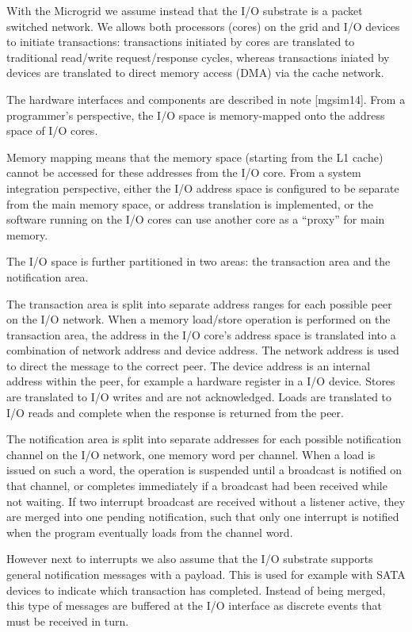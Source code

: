 With the Microgrid we assume instead that the I/O substrate is a
packet switched network. We allows both processors (cores) on the grid
and I/O devices to initiate transactions: transactions initiated by
cores are translated to traditional read/write request/response
cycles, whereas transactions iniated by devices are translated to
direct memory access (DMA) via the cache network.


The hardware interfaces and components are described in note
[mgsim14]. From a programmer's perspective, the I/O space is
memory-mapped onto the address space of I/O cores. 

Memory mapping means that the memory space (starting from the L1
cache) cannot be accessed for these addresses from the I/O core. From
a system integration perspective, either the I/O address space is
configured to be separate from the main memory space, or address
translation is implemented, or the software running on the I/O cores
can use another core as a ``proxy'' for main memory.

The I/O space is further partitioned in two areas: the transaction
area and the notification area. 

The transaction area is split into separate address ranges for each
possible peer on the I/O network. When a memory load/store operation
is performed on the transaction area, the address in the I/O core's
address space is translated into a combination of network address and
device address. The network address is used to direct the message to
the correct peer. The device address is an internal address within the
peer, for example a hardware register in a I/O device. Stores are
translated to I/O writes and are not acknowledged. Loads are
translated to I/O reads and complete when the response is returned
from the peer.

The notification area is split into separate addresses for each
possible notification channel on the I/O network, one memory word per
channel. When a load is issued on such a word, the operation is
suspended until a broadcast is notified on that channel, or completes
immediately if a broadcast had been received while not waiting. If two
interrupt broadcast are received without a listener active, they are
merged into one pending notification, such that only one interrupt is
notified when the program eventually loads from the channel word.

However next to interrupts we also assume that the I/O substrate
supports general notification messages with a payload. This is used
for example with SATA devices to indicate which transaction has
completed. Instead of being merged, this type of messages are buffered
at the I/O interface as discrete events that must be received in turn.
